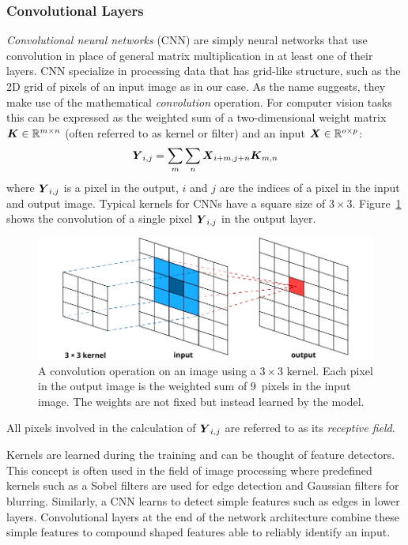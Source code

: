 \subsubsection{Convolutional Layers}
\emph{Convolutional neural networks} (CNN) are simply neural networks that use convolution in place of general matrix multiplication in at least one of their layers. CNN specialize in processing data that has grid-like structure, such as the 2D grid of pixels of an input image as in our case. As the name suggests, they make use of the mathematical \emph{convolution} operation. For computer vision tasks this can be expressed as the weighted sum of a two-dimensional weight matrix $ \boldsymbol{K} \in\mathbb{R}^{m \times n} $ (often referred to as kernel or filter) and an input $ \boldsymbol{X} \in\mathbb{R}^{o \times p} $:
$$
	\boldsymbol{Y}_{i, j} = \sum_m \sum_n \boldsymbol{X}_{i + m, j + n} \boldsymbol{K}_{m, n}
$$	
	where $\boldsymbol{Y}_{i, j}$ is a pixel in the output, $i$ and $j$ are the indices of a pixel in the input and output image. Typical kernels for CNNs have a square size of $3 \times 3$. Figure~\ref{fig:convolution} shows the convolution of a single pixel $\boldsymbol{Y}_{i, j}$ in the output layer.
	\begin{figure}[tp]
  		\centering
    	\includegraphics{img/convolution.pdf}
    	\caption{A convolution operation on an image using a $3 \times 3$ kernel. Each pixel in the output image is the weighted sum of \num{9}~pixels in the input image. The weights are not fixed but instead learned by the model.}
    	\label{fig:convolution}
	\end{figure}
	All pixels involved in the calculation of $\boldsymbol{Y}_{i, j}$ are referred to as its \emph{receptive field}. 

Kernels are learned during the training and can be thought of feature detectors. This concept is often used in the field of image processing where predefined kernels such as a Sobel filters are used for edge detection and Gaussian filters for blurring. Similarly, a CNN learns to detect simple features such as edges in lower layers. Convolutional layers at the end of the network architecture combine these simple  features to compound shaped features able to reliably identify an input. 

